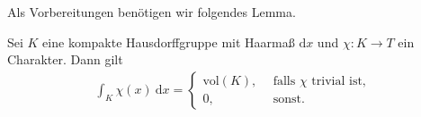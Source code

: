 Als Vorbereitungen benötigen wir folgendes Lemma.
\begin{lem}
Sei $K$ eine kompakte Hausdorffgruppe mit Haarmaß $\mathrm{d}x$ und $\chi \colon K\to T$ ein Charakter. Dann gilt
\begin{align*}
\int_K \chi(x)~\mathrm{d}x=\begin{cases}
\text{vol}(K),~~&\text{falls } \chi \text{ trivial ist},\\
0,&\text{sonst.}
\end{cases}
\end{align*}
\end{lem}
